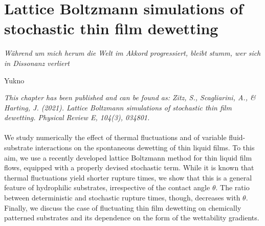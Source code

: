 \chapter{Lattice Boltzmann simulations of stochastic thin film dewetting}
\label{chapter:second_paper}
\epigraph{\textit{Während um mich herum die Welt im Akkord progressiert, bleibt stumm, wer sich in Dissonanz verliert}}{Yukno}

\textit{\small{This chapter has been published and can be found as: Zitz, S., Scagliarini, A., \& Harting, J. (2021). Lattice Boltzmann simulations of stochastic thin film dewetting. Physical Review E, 104(3), 034801.}}
\\
\\

We study numerically the effect of thermal fluctuations and of variable 
fluid-substrate interactions on the spontaneous dewetting of thin liquid films.
To this aim, we use a recently developed lattice Boltzmann method for 
thin liquid film flows, equipped with a properly devised stochastic term.
While it is known that thermal fluctuations yield shorter rupture times,
we show that this is a general feature of hydrophilic substrates, irrespective of the contact angle $\theta$.
The ratio between deterministic and stochastic rupture times, though, decreases with $\theta$. 
Finally, we discuss the case of fluctuating thin film dewetting on chemically patterned substrates
and its dependence on the form of the wettability gradients.

